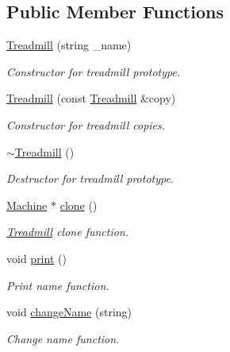 \subsection*{Public Member Functions}
\begin{DoxyCompactItemize}
\item 
\hyperlink{class_treadmill_a4f25c125cffee47960cedd2f003c61bd}{Treadmill} (string \+\_\+name)
\begin{DoxyCompactList}\small\item\em Constructor for treadmill prototype. \end{DoxyCompactList}\item 
\hyperlink{class_treadmill_a61ab63a87accfd647c2815ca64d0a3a3}{Treadmill} (const \hyperlink{class_treadmill}{Treadmill} \&copy)
\begin{DoxyCompactList}\small\item\em Constructor for treadmill copies. \end{DoxyCompactList}\item 
\hypertarget{class_treadmill_a9269ef0174af69f96d65de8f416dca6e}{}\hyperlink{class_treadmill_a9269ef0174af69f96d65de8f416dca6e}{$\sim$\+Treadmill} ()\label{class_treadmill_a9269ef0174af69f96d65de8f416dca6e}

\begin{DoxyCompactList}\small\item\em Destructor for treadmill prototype. \end{DoxyCompactList}\item 
\hyperlink{class_machine}{Machine} $\ast$ \hyperlink{class_treadmill_a30d83dada44a2d148e8d14dcf9d8d6d6}{clone} ()
\begin{DoxyCompactList}\small\item\em \hyperlink{class_treadmill}{Treadmill} clone function. \end{DoxyCompactList}\item 
void \hyperlink{class_treadmill_a0663e09b1573550cd6241d086482e973}{print} ()
\begin{DoxyCompactList}\small\item\em Print name function. \end{DoxyCompactList}\item 
void \hyperlink{class_treadmill_a7600b2dee59e7a4f8cd37c270c4ca67f}{change\+Name} (string)
\begin{DoxyCompactList}\small\item\em Change name function. \end{DoxyCompactList}\end{DoxyCompactItemize}



